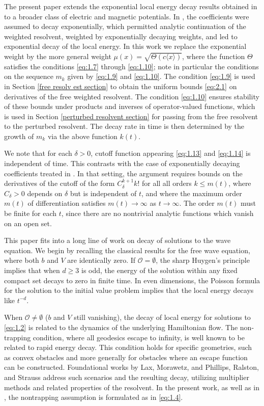 \documentclass[11pt]{amsart}
\numberwithin{equation}{section}
\begin{document}
The present paper extends the exponential local energy decay results obtained in \cite{kn:LSV} to a broader class of electric and magnetic potentials. In \cite{kn:LSV}, the coefficients were assumed to decay exponentially, which permitted analytic continuation of the weighted resolvent, weighted by exponentially decaying weights, and led to exponential decay of the local energy. In this work we replace the exponential weight by the more general weight $\mu(x) = \sqrt{\Theta(c \langle x \rangle)}$, where the function $\Theta$ satisfies the conditions \eqref{eq:1.7} through \eqref{eq:1.10}; note in particular the conditions on the sequence ${m_k}$ given by \eqref{eq:1.9} and \eqref{eq:1.10}. The condition \eqref{eq:1.9} is used in Section \ref{free resolv est section} to obtain the uniform bounds \eqref{eq:2.1} on derivatives of the free weighted resolvent.  The condition \eqref{eq:1.10} ensures stability of these bounds under products and inverses of operator-valued functions, which is used in Section \ref{perturbed resolvent section} for passing from the free resolvent to the perturbed resolvent. The decay rate in time is then determined by the growth of $m_k$ via the above function $k(t)$.

We note that for each $\delta > 0$, cutoff function appearing \eqref{eq:1.13} and \eqref{eq:1.14} is independent of time. This contrasts with the case of exponentially decaying coefficients treated in \cite{kn:LSV}. In that setting, the argument requires bounds on the derivatives of the cutoff of the form $C^{k+1}_\delta k!$ for all all orders $k \le m(t)$, where $C_\delta > 0$ depends on $\delta$ but is independent of $t$, and where the maximum order $m(t)$ of differentiation satisfies $m(t) \to \infty$ as $t \to \infty$. The order $m(t)$ must be finite for each $t$, since there are no nontrivial analytic functions which vanish on an open set.

This paper fits into a long line of work on decay of solutions to the wave equation. We begin by recalling the classical results for the free wave equation, where both $b$ and $V$ are identically zero. If $\mathcal{O} = \emptyset$, the sharp Huygen's principle implies that when $d \ge 3$ is odd, the energy of the solution within any fixed compact set decays to zero in finite time. In even dimensions, the Poisson formula for the solution to the initial value problem implies that the local energy decays like $t^{-d}$. 

When $\mathcal{O} \neq \emptyset$ ($b$ and $V$ still vanishing), the decay of local energy for solutions to \eqref{eq:1.2} is related to the dynamics of the underlying Hamiltonian flow. The non-trapping condition, where all geodesics escape to infinity, is well known to be related to rapid energy decay.  This condition holds for specific geometries, such as convex obstacles and more generally for obstacles where an escape function can be constructed. Foundational works by Lax, Morawetz, and Phillips, Ralston, and Strauss \cite{kn:lmp, kn:M1, kn:M2, kn:MRS} address such scenarios and the resulting decay, utilizing multiplier methods and related properties of the resolvent. In the present work, as well as in \cite{kn:LSV}, the nontrapping assumption is formulated as in \eqref{eq:1.4}.
\end{document}
